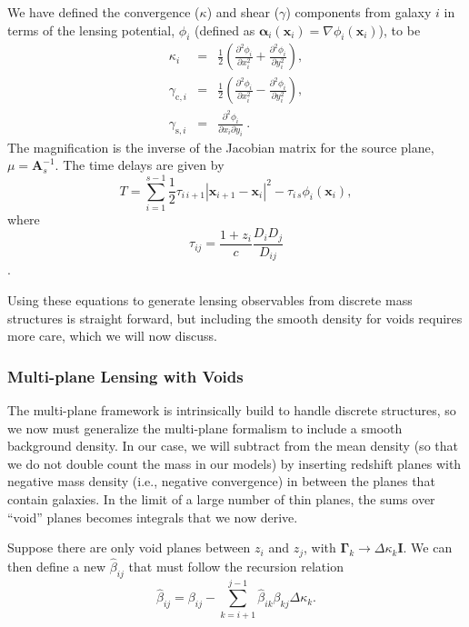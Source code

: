 \documentclass{emulateapj}
\newcommand\A[0]{\mathbf{A}}
\newcommand\I[0]{\mathbf{I}}
\newcommand\GammaMat[0]{\boldsymbol{\Gamma}}
\newcommand\x[0]{\mathbf{x}}
\newcommand\al[0]{\boldsymbol{\alpha}}
\newcommand\betahat{\hat{\beta}}
\begin{document}
We have defined the convergence ($\kappa$) and shear ($\gamma$) components from galaxy $i$ in terms of the lensing potential, $\phi_i$ (defined as $\al_i(\x_i) = \nabla\phi_i(\x_i)$), to be
\begin{eqnarray}
  \kappa_i &=& \frac{1}{2} \left( \frac{\partial^2\phi_i}{\partial x_i^2} +
    \frac{\partial^2\phi_i}{\partial y_i^2} \right) , \\
  \gamma_{\mathrm{c},i} &=& \frac{1}{2} \left( \frac{\partial^2\phi_i}{\partial x_i^2} -
    \frac{\partial^2\phi_i}{\partial y_i^2} \right) , \\
  \gamma_{\mathrm{s},i} &=& \frac{\partial^2\phi_i}{\partial x_i \partial y_i}\ .
\end{eqnarray}
The magnification is the inverse of the Jacobian matrix for the source plane, $\mu = \A_s^{-1}$.
The time delays are given by
\begin{equation}
  T = \sum_{i=1}^{s-1}  \frac{1}{2} \tau_{i\,i+1} \left |\x_{i+1} - \x_i \right |^2 - \tau_{i\,s} \phi_i(\x_i),
\label{eqn:full_t}
\end{equation}
where 
\begin{equation}
\tau_{ij} =\frac{1+z_i}{c} \frac{D_i D_j}{D_{ij}}
\end{equation}.

Using these equations to generate lensing observables from discrete mass structures is straight forward, but including the smooth density for voids requires more care, which we will now discuss.

\subsubsection{Multi-plane Lensing with Voids}
The multi-plane framework is intrinsically build to handle discrete structures, so we now must generalize the multi-plane formalism to include a smooth background density. In our case, we will subtract from the mean density (so that we do not double count the mass in our models) by inserting redshift planes with negative mass density (i.e., negative convergence) in between the planes that contain galaxies. In the limit of a large number of thin planes, the sums over ``void'' planes becomes integrals that we now derive.

Suppose there are only void planes between $z_i$ and $z_j$, with $\GammaMat_k \rightarrow \Delta \kappa_k \I$. We can then define a new $\betahat_{i j}$ that must follow the recursion relation
\begin{equation}
\label{eqn:betahatdef}
\betahat_{i j}  = \beta_{i j} - \sum \limits_{k = i +1}^{j -1} \betahat_{i k} \beta_{k j} \Delta \kappa_k.
\end{equation}
\end{document}
